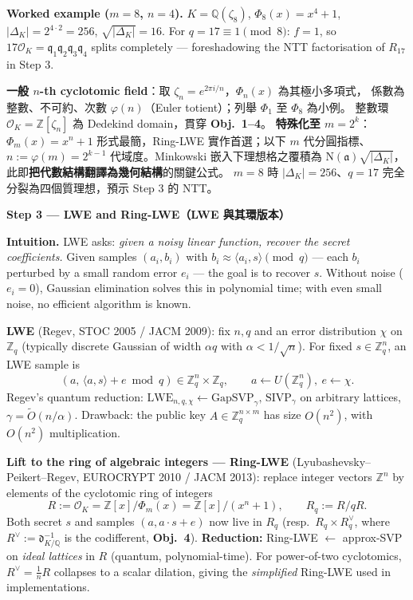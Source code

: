 \documentclass[12pt, a4paper]{article}
\begin{document}
\textbf{Worked example ($m=8$, $n=4$).} $K=\mathbb{Q}(\zeta_8)$, $\Phi_8(x)=x^4+1$,
$|\Delta_K|=2^{4\cdot 2}=256$, $\sqrt{|\Delta_K|}=16$. For $q=17\equiv 1\pmod 8$: $f=1$,
so $17\mathcal{O}_K=\mathfrak{q}_1\mathfrak{q}_2\mathfrak{q}_3\mathfrak{q}_4$ splits completely
— foreshadowing the NTT factorisation of $R_{17}$ in Step 3.

\textbf{一般 $n$-th cyclotomic field}：取 $\zeta_n=e^{2\pi i/n}$，$\Phi_n(x)$ 為其極小多項式，
係數為整數、不可約、次數 $\varphi(n)$（Euler totient）；列舉 $\Phi_1$ 至 $\Phi_8$ 為小例。
整數環 $\mathcal{O}_K=\mathbb{Z}[\zeta_n]$ 為 Dedekind domain，貫穿 \textbf{Obj.\ 1--4}。
\textbf{特殊化至 $m=2^k$}：$\Phi_m(x)=x^n+1$ 形式最簡，Ring-LWE 實作首選；以下 $m$ 代分圓指標、
$n:=\varphi(m)=2^{k-1}$ 代域度。Minkowski 嵌入下理想格之覆積為
$\mathrm{N}(\mathfrak{a})\sqrt{|\Delta_K|}$，此即\textbf{把代數結構翻譯為幾何結構}的關鍵公式。
$m=8$ 時 $|\Delta_K|=256$、$q=17$ 完全分裂為四個質理想，預示 Step 3 的 NTT。

\medskip
\textbf{Step 3 --- LWE and Ring-LWE（LWE 與其環版本）}

\textbf{Intuition.} LWE asks: \textit{given a noisy linear function, recover the secret coefficients.}
Given samples $(a_i,b_i)$ with $b_i\approx\langle a_i,s\rangle\pmod q$ — each $b_i$ perturbed by a
small random error $e_i$ — the goal is to recover $s$. Without noise ($e_i=0$), Gaussian
elimination solves this in polynomial time; with even small noise, no efficient algorithm is known.

\textbf{LWE} (Regev, STOC 2005 / JACM 2009): fix $n,q$ and an error distribution $\chi$ on
$\mathbb{Z}_q$ (typically discrete Gaussian of width $\alpha q$ with $\alpha<1/\sqrt{n}$). For
fixed $s\in\mathbb{Z}_q^n$, an LWE sample is
\[
  (a,\,\langle a,s\rangle+e\bmod q)\in\mathbb{Z}_q^n\times\mathbb{Z}_q,
  \qquad a\leftarrow U(\mathbb{Z}_q^n),\ e\leftarrow\chi.
\]
Regev's quantum reduction:
$\mathrm{LWE}_{n,q,\chi}\longleftarrow\mathrm{GapSVP}_\gamma,\,\mathrm{SIVP}_\gamma$ on arbitrary
lattices, $\gamma=\widetilde{O}(n/\alpha)$. Drawback: the public key $A\in\mathbb{Z}_q^{n\times m}$
has size $O(n^2)$, with $O(n^2)$ multiplication.

\textbf{Lift to the ring of algebraic integers — Ring-LWE} (Lyubashevsky--Peikert--Regev,
EUROCRYPT 2010 / JACM 2013): replace integer vectors $\mathbb{Z}^n$ by elements of the cyclotomic
ring of integers
\[
  R := \mathcal{O}_K = \mathbb{Z}[x]/\Phi_m(x) = \mathbb{Z}[x]/(x^n+1), \qquad R_q := R/qR.
\]
Both secret $s$ and samples $(a, a\!\cdot\!s+e)$ now live in $R_q$ (resp.\ $R_q\times R_q^\vee$,
where $R^\vee:=\mathfrak{d}_{K/\mathbb{Q}}^{-1}$ is the codifferent, \textbf{Obj.\ 4}).
\textbf{Reduction:} Ring-LWE $\longleftarrow$ approx-SVP on \textit{ideal lattices} in $R$
(quantum, polynomial-time). For power-of-two cyclotomics, $R^\vee=\tfrac{1}{n}R$ collapses to a
scalar dilation, giving the \textit{simplified} Ring-LWE used in implementations.
\end{document}
